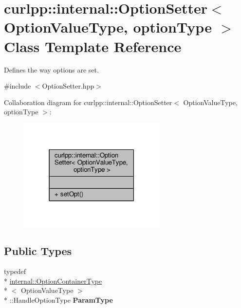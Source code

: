 \hypertarget{classcurlpp_1_1internal_1_1OptionSetter}{\section{curlpp\-:\-:internal\-:\-:Option\-Setter$<$ Option\-Value\-Type, option\-Type $>$ Class Template Reference}
\label{classcurlpp_1_1internal_1_1OptionSetter}
}


Defines the way options are set.  




{\ttfamily \#include $<$Option\-Setter.\-hpp$>$}



Collaboration diagram for curlpp\-:\-:internal\-:\-:Option\-Setter$<$ Option\-Value\-Type, option\-Type $>$\-:\nopagebreak
\begin{figure}[H]
\begin{center}
\leavevmode
\includegraphics[width=210pt]{classcurlpp_1_1internal_1_1OptionSetter__coll__graph}
\end{center}
\end{figure}
\subsection*{Public Types}
\begin{DoxyCompactItemize}
\item 
\hypertarget{classcurlpp_1_1internal_1_1OptionSetter_aa434d2d90d6936737512d72aab4f94c4}{typedef \\*
\hyperlink{structcurlpp_1_1internal_1_1OptionContainerType}{internal\-::\-Option\-Container\-Type}\\*
$<$ Option\-Value\-Type $>$\\*
\-::Handle\-Option\-Type {\bfseries Param\-Type}}\label{classcurlpp_1_1internal_1_1OptionSetter_aa434d2d90d6936737512d72aab4f94c4}

\end{DoxyCompactItemize}
